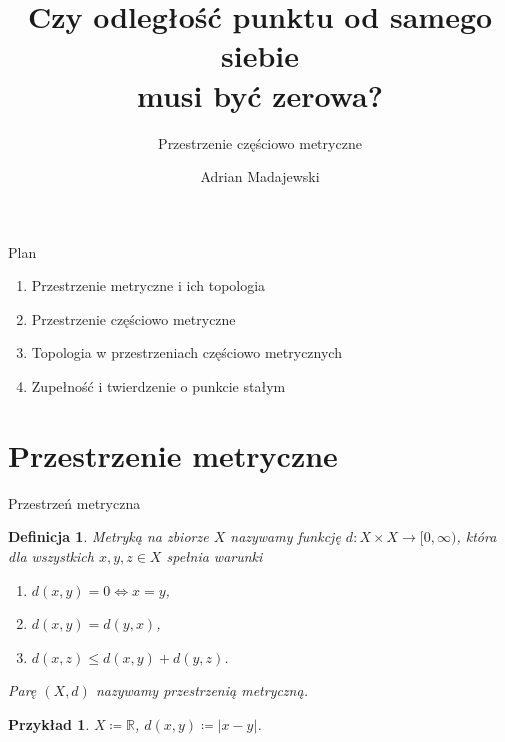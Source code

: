\documentclass{beamer}
\title[Czy odległość punktu od samego siebie musi być zerowa?]{Czy odległość punktu od samego siebie\\musi być zerowa?}
\subtitle{Przestrzenie częściowo metryczne}
\author{Adrian Madajewski}
\institute{Wydział Matematyki i Informatyki UAM}
\date{}
\newtheorem*{definicja}{Definicja}
\newtheorem*{przyklad}{Przykład}
\newcommand{\R}{\mathbb{R}}
\begin{document}
\begin{frame}
  \titlepage
\end{frame}

\begin{frame}{Plan}
  \begin{enumerate}
    \item Przestrzenie metryczne i ich topologia
    \item Przestrzenie częściowo metryczne
    \item Topologia w przestrzeniach częściowo metrycznych
    \item Zupełność i twierdzenie o punkcie stałym
  \end{enumerate}
\end{frame}

\section{Przestrzenie metryczne}

\begin{frame}{Przestrzeń metryczna}
  \begin{definicja}
    \emph{Metryką} na zbiorze $X$ nazywamy funkcję $d\colon X\times X\to[0,\infty)$,
    która dla wszystkich $x,y,z\in X$ spełnia warunki
    \begin{enumerate}
      \item[(M1)] $d(x,y)=0 \iff x=y$,
      \item[(M2)] $d(x,y)=d(y,x)$,
      \item[(M3)] $d(x,z)\le d(x,y)+d(y,z)$.
    \end{enumerate}
    Parę $(X,d)$ nazywamy \emph{przestrzenią metryczną}.
  \end{definicja}

  \begin{przyklad}
    $X\coloneqq\R$, $d(x,y)\coloneqq|x-y|$.
  \end{przyklad}
\end{frame}
\end{document}
